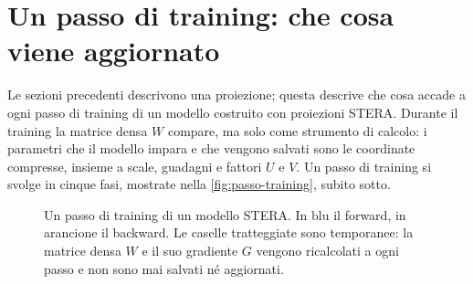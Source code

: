\section{Un passo di training: che cosa viene aggiornato}
\label{sec:passo-training}

Le sezioni precedenti descrivono una proiezione; questa descrive che cosa accade a ogni passo di training di un modello costruito con proiezioni STERA. Durante il training la matrice densa $W$ compare, ma solo come strumento di calcolo: i parametri che il modello impara e che vengono salvati sono le coordinate compresse, insieme a scale, guadagni e fattori $U$ e $V$. Un passo di training si svolge in cinque fasi, mostrate nella \autoref{fig:passo-training}, subito sotto.

\begin{figure}[H]
\centering
\resizebox{\linewidth}{!}{}
\caption{Un passo di training di un modello STERA. In blu il forward, in arancione il backward. Le caselle tratteggiate sono temporanee: la matrice densa $W$ e il suo gradiente $G$ vengono ricalcolati a ogni passo e non sono mai salvati né aggiornati.}
\label{fig:passo-training}
\end{figure}

